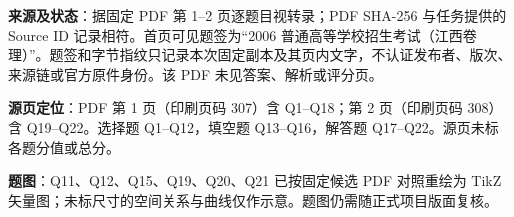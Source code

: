 

\begin{gktip}
\textbf{来源及状态}：据固定 PDF 第 1–2 页逐题目视转录；PDF SHA-256 与任务提供的 Source ID 记录相符。首页可见题签为“2006 普通高等学校招生考试（江西卷理）”。题签和字节指纹只记录本次固定副本及其页内文字，不认证发布者、版次、来源链或官方原件身份。该 PDF 未见答案、解析或评分页。

\textbf{源页定位}：PDF 第 1 页（印刷页码 307）含 Q1–Q18；第 2 页（印刷页码 308）含 Q19–Q22。选择题 Q1–Q12，填空题 Q13–Q16，解答题 Q17–Q22。源页未标各题分值或总分。

\textbf{题图}：Q11、Q12、Q15、Q19、Q20、Q21 已按固定候选 PDF 对照重绘为 TikZ 矢量图；未标尺寸的空间关系与曲线仅作示意。题图仍需随正式项目版面复核。
\end{gktip}


